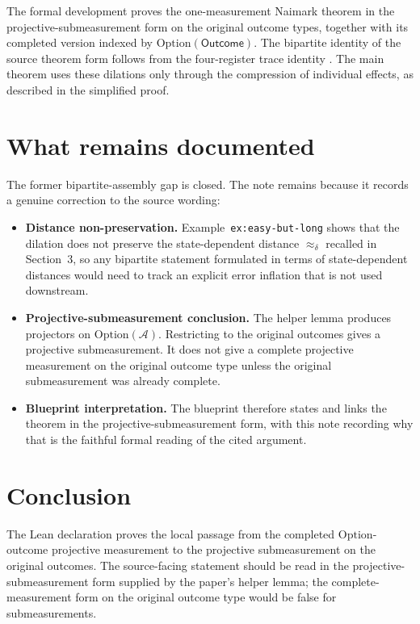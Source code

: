 \documentclass[11pt]{article}
\begin{document}
The formal development proves the one-measurement Naimark theorem in the
projective-submeasurement form on the original outcome types, together with
its completed version indexed by \(\mathrm{Option}(\mathsf{Outcome})\).  The
bipartite identity of the source theorem form follows from the four-register
trace identity .
The main theorem uses these dilations only through the compression of
individual effects, as described in the simplified proof.

\section{What remains documented}

The former bipartite-assembly gap is closed.  The note remains because it
records a genuine correction to the source wording:
\begin{itemize}
  \item \textbf{Distance non-preservation.}  Example~\texttt{ex:easy-but-long}
  shows that the dilation does not preserve the state-dependent distance
  $\approx_\delta$ recalled in Section~3, so any
  bipartite statement formulated in terms of state-dependent distances would
  need to track an explicit error inflation that is not used downstream.
  \item \textbf{Projective-submeasurement conclusion.}  The helper lemma
  produces projectors on \(\mathrm{Option}(\mathcal A)\).  Restricting to the
  original outcomes gives a projective submeasurement.  It does not give a
  complete projective measurement on the original outcome type unless the
  original submeasurement was already complete.
  \item \textbf{Blueprint interpretation.}  The blueprint therefore states and
  links the theorem in the projective-submeasurement form, with this note
  recording why that is the faithful formal reading of the cited argument.
\end{itemize}

\section{Conclusion}

The Lean declaration  proves the local
passage from the completed \(\mathrm{Option}\)-outcome projective measurement
to the projective submeasurement on the original outcomes.  The source-facing
statement should be read in the projective-submeasurement form supplied by the
paper's helper lemma; the complete-measurement form on the original outcome
type would be false for submeasurements.



\end{document}
